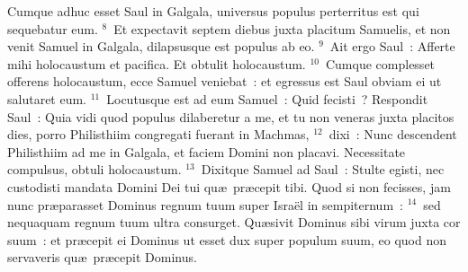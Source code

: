  Cumque adhuc esset Saul in Galgala, universus populus perterritus est qui sequebatur eum.
${}^{8}$~Et expectavit septem diebus juxta placitum Samuelis, et non venit Samuel in Galgala, dilapsusque est populus ab eo.
${}^{9}$~Ait ergo Saul~: Afferte mihi holocaustum et pacifica. Et obtulit holocaustum.
${}^{10}$~Cumque complesset offerens holocaustum, ecce Samuel veniebat~: et egressus est Saul obviam ei ut salutaret eum.
${}^{11}$~Locutusque est ad eum Samuel~: Quid fecisti~? Respondit Saul~: Quia vidi quod populus dilaberetur a me, et tu non veneras juxta placitos dies, porro Philisthiim congregati fuerant in Machmas,
${}^{12}$~dixi~: Nunc descendent Philisthiim ad me in Galgala, et faciem Domini non placavi. Necessitate compulsus, obtuli holocaustum.
${}^{13}$~Dixitque Samuel ad Saul~: Stulte egisti, nec custodisti mandata Domini Dei tui qu\ae\ pr\ae cepit tibi. Quod si non fecisses, jam nunc pr\ae parasset Dominus regnum tuum super Isra\"el in sempiternum~:
${}^{14}$~sed nequaquam regnum tuum ultra consurget. Qu\ae sivit Dominus sibi virum juxta cor suum~: et pr\ae cepit ei Dominus ut esset dux super populum suum, eo quod non servaveris qu\ae\ pr\ae cepit Dominus.


